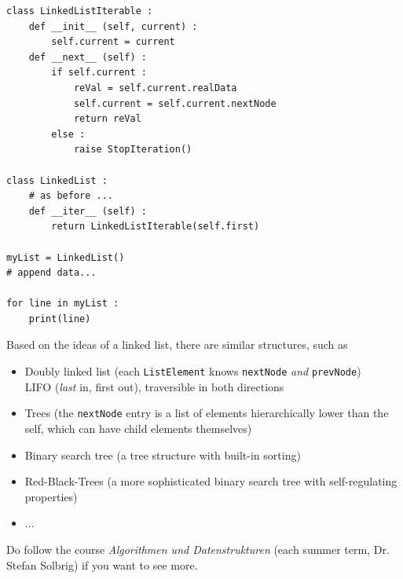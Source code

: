 
\begin{frame}[fragile]
%
\begin{codebox}
\begin{verbatim}
class LinkedListIterable :
    def __init__ (self, current) :
        self.current = current
    def __next__ (self) :
        if self.current :
            reVal = self.current.realData
            self.current = self.current.nextNode
            return reVal
        else :
            raise StopIteration()

class LinkedList :
    # as before ...
    def __iter__ (self) :
        return LinkedListIterable(self.first)

myList = LinkedList()
# append data...

for line in myList :
    print(line)
\end{verbatim}
\end{codebox}
%
\end{frame}


\begin{frame}
%
\begin{hintbox}
Based on the ideas of a linked list, there are similar structures, such as
\begin{itemize}
\item Doubly linked list (each \texttt{ListElement} knows \texttt{nextNode} \emph{and} \texttt{prevNode})\\
	\Thus\; LIFO (\emph{last} in, first out), traversible in both directions
\item Trees (the \texttt{nextNode} entry is a list of elements hierarchically lower than the self, which can have child elements themselves)
\item Binary search tree (a tree structure with built-in sorting)
\item Red-Black-Trees (a more sophisticated binary search tree with self-regulating properties)
\item ...
\end{itemize}

Do follow the course \emph{Algorithmen und Datenstrukturen} (each summer term, Dr. Stefan Solbrig) if you want to see more.
\end{hintbox}
%
\end{frame}